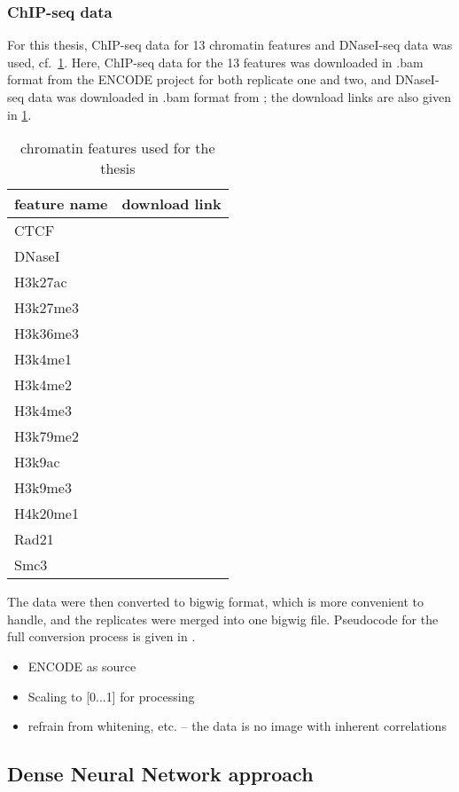 \subsubsection{ChIP-seq data} \label{sec:methods:chipseq}
For this thesis, ChIP-seq data for 13 chromatin features and DNaseI-seq data was used, cf.~\cref{tab:methods:csdata}.
Here, ChIP-seq data for the 13 features was downloaded in .bam format from the ENCODE project \xxx for both replicate one and two,
and DNaseI-seq data was downloaded in .bam format from \xxx; the download links are also given in \cref{tab:methods:csdata}.
\begin{table}[ht!]
\centering
 \begin{tabular}{ll}
 \hline
  feature name & download link \\  \hline
  CTCF & \\
  DNaseI &\\
  H3k27ac & \\
  H3k27me3 &\\
  H3k36me3 &\\
  H3k4me1 &\\
  H3k4me2 &\\
  H3k4me3 &\\
  H3k79me2 &\\
  H3k9ac &\\
  H3k9me3 &\\
  H4k20me1 &\\
  Rad21 &\\
  Smc3 & \\ \hline
 \end{tabular}
 \caption{chromatin features used for the thesis} \label{tab:methods:csdata}
\end{table}

The data were then converted to bigwig format, which is more convenient to handle, and the replicates were merged into 
one bigwig file. Pseudocode for the full conversion process is given in \xxx.

\begin{itemize}
 \item ENCODE as source
 \item Scaling to [0...1] for processing
 \item refrain from whitening, etc. -- the data is no image with inherent correlations
\end{itemize}


\subsection{Dense Neural Network approach} \label{sec:methods:denseNN}
